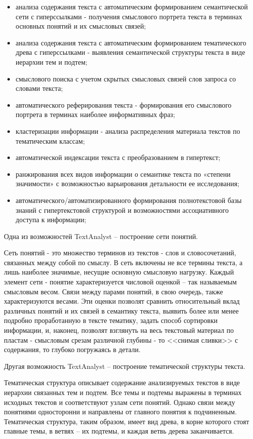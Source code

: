 	\begin{itemize}
		\item анализа содержания текста с автоматическим формированием семантической сети с гиперссылками - получения смыслового портрета текста в терминах основных понятий и их смысловых связей; 
		\item анализа содержания текста с автоматическим формированием тематического древа с гиперссылками - выявления семантической структуры текста в виде иерархии тем и подтем; 
		\item смыслового поиска с учетом скрытых смысловых связей слов запроса со словами текста; 
		\item автоматического реферирования текста - формирования его смыслового портрета в терминах наиболее информативных фраз; 
		\item кластеризации информации - анализа распределения материала текстов по тематическим классам;
		\item автоматической индексации текста с преобразованием в гипертекст; 
		\item ранжирования всех видов информации о семантике текста по «степени значимости» с возможностью варьирования детальности ее исследования; 
		\item автоматического/автоматизированного формирования полнотекстовой базы знаний с гипертекстовой структурой и возможностями ассоциативного доступа к информации; 
	\end{itemize}
	
	Одна из возможностей TextAnalyst – построение сети понятий. 
	
	Сеть понятий - это множество терминов из текстов - слов и словосочетаний, связанных между собой по смыслу. 
	В сеть включены не все термины текста, а лишь наиболее значимые, несущие основную смысловую нагрузку. 
	Каждый элемент сети - понятие характеризуется числовой оценкой – так называемым смысловым весом. 
	Связи между парами понятий, в свою очередь, также характеризуются весами. 
	Эти оценки позволят сравнить относительный вклад различных понятий и их связей в семантику текста, выявить более или менее подробно проработанную в тексте тематику, задать способ сортировки информации, и, наконец, позволят взглянуть на весь текстовый материал по пластам - смысловым срезам различной глубины - то <<снимая сливки>> с содержания, то глубоко погружаясь в детали. 
	
	Другая возможность TextAnalyst – построение тематической структуры текста. 
	
	Тематическая структура описывает содержание анализируемых текстов в виде иерархии связанных тем и подтем. 
	Все темы и подтемы выражены в терминах исходных текстов и соответствуют узлам сети понятий. 
	Однако связи между понятиями односторонни и направлены от главного понятия к подчиненным. 
	Тематическая структура, таким образом, имеет вид древа, в корне которого стоят главные темы, в ветвях – их подтемы, и каждая ветвь дерева заканчивается. 
	
